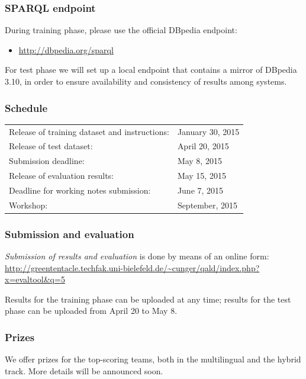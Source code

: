 \documentclass[a4paper]{article}
\begin{document}
{\subsubsection*{SPARQL endpoint}

During training phase, please use the official DBpedia endpoint:
\begin{itemize}
\item[] \url{http://dbpedia.org/sparql}
\end{itemize}
For test phase we will set up a local endpoint that contains a mirror of DBpedia 3.10, 
in order to ensure availability and consistency of results among systems. 

\subsubsection*{Schedule}

\begin{tabular}{ll}
Release of training dataset and instructions: & January 30, 2015 \\
Release of test dataset: & April 20, 2015 \\
Submission deadline: & May 8, 2015 \\
Release of evaluation results: & May 15, 2015 \\
Deadline for working notes submission: & June 7, 2015 \\
Workshop: & September, 2015 \\
\end{tabular}

\subsubsection*{Submission and evaluation}

{\em Submission of results and evaluation} is done by means of an online form:\\
\url{http://greententacle.techfak.uni-bielefeld.de/~cunger/qald/index.php?x=evaltool&q=5}

Results for the training phase can be uploaded at any time; results for the test phase can be uploaded from April 20 to May 8.

\subsubsection*{Prizes}

We offer prizes for the top-scoring teams, both in the multilingual and the hybrid track. More details will be announced soon. 

}
\end{document}
